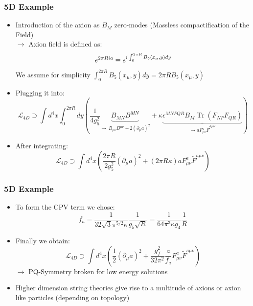 \documentclass[aspectratio=1610, 9pt]{beamer}
\DeclareMathOperator{\Tr}{Tr}
\begin{document}
\begin{frame}
	\frametitle{5D Example}
		\begin{itemize}
			\item Introduction of the axion as $B_M$ zero-modes (Massless compactification of the Field)\\
			$\rightarrow$ Axion field is defined as: 
			\begin{equation*}
				{\Large e^{2\pi R i a} \equiv e^{i\int_{0}^{2\pi R}B_5(x_\mu, y)dy}}
			\end{equation*}
			We assume for simplicity $\int_{0}^{2\pi R}B_5(x_\mu, y)dy = 2\pi RB_5(x_\mu, y)$
			\item Plugging it into:
			\begin{equation*}
				\mathcal{L}_{4D} \supset \int d^4x \int_0^{2\pi R} dy \left( \frac{1}{4 g_5^2} \underbrace{B_{MN} B^{MN}}_{\rightarrow\ B_{\mu\nu}B^{\mu\nu} + 2(\partial_\mu a)^2} + \kappa \underbrace{\epsilon^{MNPQR} B_M \Tr(F_{NP} F_{QR})}_{\rightarrow aF_{\mu\nu}^a \tilde{F}^{a\mu\nu}} \right)
			\end{equation*}
			\item After integrating:
			\begin{equation*}
				\mathcal{L}_{4D} \supset \int d^4x \left( \frac{2\pi R}{2g_5^2} (\partial_\mu a)^2 + (2\pi R \kappa) a F_{\mu\nu}^a \tilde{F}^{a\mu\nu} \right)
			\end{equation*}
		\end{itemize}
\end{frame}

\begin{frame}
	\frametitle{5D Example}
	\begin{itemize}
		\item To form the CPV term we chose:
		\begin{equation*}
			f_a = \frac{1}{32 \sqrt{3} \pi^{5/2} \kappa} \frac{1}{g_5 \sqrt{R}} = \frac{1}{64 \pi^3 \kappa g_4} \frac{1}{R}
		\end{equation*}
		\item Finally we obtain:
		\begin{equation*}
			\mathcal{L}_{4D} \supset \int d^4x \left( \frac{1}{2} (\partial_\mu a)^2 + \frac{g_f^2}{32 \pi^2} \frac{a}{f_a} F_{\mu\nu}^a \tilde{F}^{a\mu\nu} \right)
		\end{equation*}
		$\rightarrow$ PQ-Symmetry broken for low energy solutions
    \item Higher dimension string theories give rise to a multitude of axions or axion like particles (depending on topology)
	\end{itemize}
\end{frame}
\end{document}
